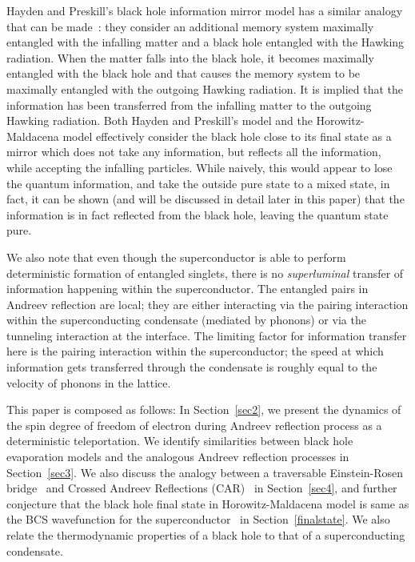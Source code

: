 \documentclass[10pt,letterpaper,aps,onecolumn,superscriptaddress,floatfix,notitlepage]{revtex4-1}
\begin{document}
	Hayden and Preskill's black hole information mirror model has a similar analogy that can be made~\cite{preskill}: they consider an additional memory system maximally entangled with the infalling matter and a black hole entangled with the Hawking radiation. When the matter falls into the black hole, it becomes maximally entangled with the black hole and that causes the memory system to be maximally entangled with the outgoing Hawking radiation. It is implied that the information has been transferred from the infalling matter to the outgoing Hawking radiation. Both Hayden and Preskill's model and the Horowitz-Maldacena model effectively consider the black hole close to its final state as a mirror which does not take any information, but reflects all the information, while accepting the infalling particles. While naively, this would appear to lose the quantum information, and take the outside pure state to a mixed state, in fact, it can be shown (and will be discussed in detail later in this paper) that the information is in fact reflected from the black hole, leaving the quantum state pure.
	
	We also note that even though the superconductor is able to perform deterministic formation of entangled singlets, there is no \textit{superluminal} transfer of information happening within the superconductor. The entangled pairs in Andreev reflection are local; they are either interacting via the pairing interaction within the superconducting condensate (mediated by phonons) or via the tunneling interaction at the interface. The limiting factor for information transfer here is the pairing interaction within the superconductor; the speed at which information gets transferred through the condensate is roughly equal to the velocity of phonons in the lattice.   
	
	This paper is composed as follows: In Section~\ref{sec2}, we present the dynamics of the spin degree of freedom of electron during Andreev reflection process as a deterministic teleportation. We identify similarities between black hole evaporation models and the analogous Andreev reflection processes in Section~\ref{sec3}. We also discuss the analogy between a traversable Einstein-Rosen bridge~\cite{wormhole} and Crossed Andreev Reflections (CAR)~\cite{car} in Section~\ref{sec4}, and further conjecture that the black hole final state in Horowitz-Maldacena model is same as the BCS wavefunction for the superconductor~\cite{BCS} in Section~\ref{finalstate}. We also relate the thermodynamic properties of a black hole to that of a superconducting condensate.
\end{document}
